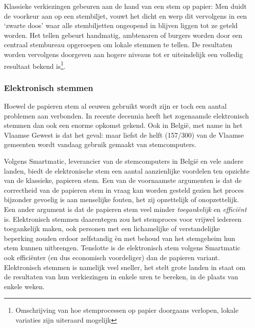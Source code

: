 			Klassieke verkiezingen gebeuren aan de hand van een stem op papier: Men duidt de voorkeur aan op een stembiljet, vouwt het dicht en werp dit vervolgens in een `zwarte doos' waar alle stembiljetten ongeopend in blijven liggen tot ze geteld worden. Het tellen gebeurt handmatig, ambtenaren of burgers worden door een centraal stembureau opgeroepen om lokale stemmen te tellen. De resultaten worden vervolgens doorgeven aan hogere niveaus tot er uiteindelijk een volledig resultaat bekend is\footnote{ Omschrijving van hoe stemprocessen op papier doorgaans verlopen, lokale variaties zijn uiteraard mogelijk}.
			
			\subsubsection{Elektronisch stemmen}
			Hoewel de papieren stem al eeuwen gebruikt wordt zijn er toch een aantal problemen aan verbonden. In recente decennia heeft het zogenaamde elektronisch stemmen dan ook een enorme opkomst gekend. Ook in België, met name in het Vlaamse Gewest is dat het geval: maar liefst de helft (157/300) van de Vlaamse gemeenten wordt vandaag gebruik gemaakt van stemcomputers.
			
			Volgens Smartmatic, leverancier van de stemcomputers in België en vele andere landen, biedt de elektronische stem een aantal aanzienlijke voordelen ten opzichte van de klassieke, papieren stem. Een van de voornaamste argumenten is dat de correctheid van de papieren stem in vraag kan worden gesteld gezien het proces bijzonder gevoelig is aan menselijke fouten, het zij opzettelijk of onopzettelijk. Een ander argument is dat de papieren stem veel minder \textit{toegankelijk} en \textit{efficiënt} is. Elektronisch stemmen daarentegen zou het stemproces voor vrijwel iedereen toegankelijk maken, ook personen met een lichamelijke of verstandelijke beperking zouden erdoor zelfstandig èn met behoud van het stemgeheim hun stem kunnen uitbrengen. Tenslotte is de elektronisch stem volgens Smartmatic ook efficiënter (en dus economisch voordeliger) dan de papieren variant. Elektronisch stemmen is namelijk veel sneller, het stelt grote landen in staat om de resultaten van hun verkiezingen in enkele uren te bereken, in de plaats van enkele weken.
			
